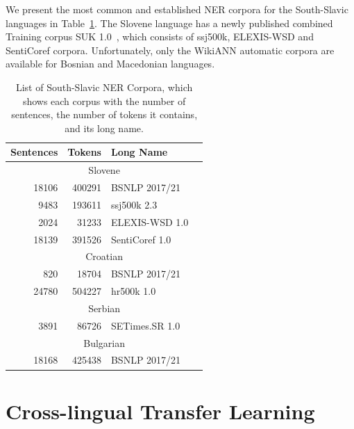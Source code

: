 We present the most common and established NER corpora for the South-Slavic languages in Table~\ref{tab:corpora}.
The Slovene language has a newly published combined Training corpus {SUK} 1.0~\parencite{SUK-1.0}, which consists of ssj500k, ELEXIS-WSD and SentiCoref corpora.
Unfortunately, only the WikiANN\parencite{rahimi-etal-2019-massively} automatic corpora are available for Bosnian and Macedonian languages.
\begin{table}[htb]
	\caption{List of South-Slavic NER Corpora, which shows each corpus with the number of sentences, the number of tokens it contains, and its long name.}
	\label{tab:corpora}
	\centering
		\begin{tabular}{rrlr}
			\hline
			Sentences&Tokens&Long Name&\\
			\hline
            \hline
			\multicolumn{4}{c}{Slovene} \\
			\hline
            18106&400291&BSNLP 2017/21&\parencite{piskorski-etal-2021-slav}\\
            9483&193611&ssj500k 2.3&\parencite{ssj500k-23}\\
            2024&31233&{ELEXIS}-{WSD} 1.0&\parencite{ELEXIS-WSD-10}\\
            18139&391526&{SentiCoref} 1.0&\parencite{SentiCoref-10}\\
            \hline
			\multicolumn{4}{c}{Croatian} \\
			\hline
            820&18704&BSNLP 2017/21&\parencite{piskorski-etal-2021-slav}\\
            24780&504227&hr500k 1.0&\parencite{hr500k-10}\\
            \hline
            \multicolumn{4}{c}{Serbian} \\
            \hline
            3891&86726&{SETimes}.{SR} 1.0&\parencite{SETimes-SR-1.0}\\
            \hline
            \multicolumn{4}{c}{Bulgarian} \\
            \hline
            18168&425438&BSNLP 2017/21&\parencite{piskorski-etal-2021-slav}\\
            \hline
		\end{tabular}
\end{table}

\section{Cross-lingual Transfer Learning}

